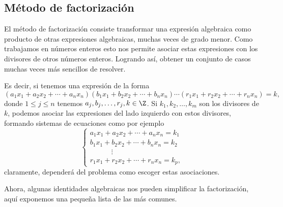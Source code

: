 \subsection{Método de factorización}

El método de factorización consiste transformar una expresión algebraica como producto de otras expresiones algebraicas, muchas veces de grado menor.
Como trabajamos en números enteros esto nos permite asociar estas expresiones con los divisores de otros números enteros.
Logrando así, obtener un conjunto de casos muchas veces más sencillos de resolver.

Es decir, si tenemos una expresión de la forma
\[
    (a_1 x_1 + a_2 x_2 + \cdots + a_n x_n)(b_1 x_1 + b_2 x_2 + \cdots + b_n x_n) \cdots (r_1 x_1 + r_2 x_2 + \cdots + r_n x_n) = k,
\]
donde $1 \leq j \leq n$ tenemos $a_j, b_j, \ldots, r_j, k \in \Z$.
Si $k_1, k_2, \ldots, k_m$ son los divisores de $k$, podemos asociar las expresiones del lado izquierdo con estos divisores, formando sistemas de ecuaciones como por ejemplo
\[
    \begin{cases}
        a_1 x_1 + a_2 x_2 + \cdots + a_n x_n = k_1\\
        b_1 x_1 + b_2 x_2 + \cdots + b_n x_n = k_2\\
        \quad \qquad \vdots\\
        r_1 x_1 + r_2 x_2 + \cdots + r_n x_n = k_p,
    \end{cases}
\]
claramente, dependerá del problema como escoger estas asociaciones.

Ahora, algunas identidades algebraicas nos pueden simplificar la factorización, aquí exponemos una pequeña lista de las más comunes.
\vspace{2mm}

